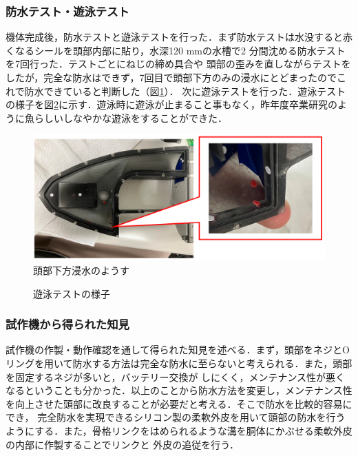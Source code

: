 \subsubsection{防水テスト・遊泳テスト}
機体完成後，防水テストと遊泳テストを行った．まず防水テストは水没すると赤くなるシールを頭部内部に貼り，水深120 mmの水槽で2 分間沈める防水テストを7回行った．テストごとにねじの締め具合や
頭部の歪みを直しながらテストをしたが，完全な防水はできず，7回目で頭部下方のみの浸水にとどまったのでこれで防水できていると判断した（図\ref{fig:bousuitest_sisaku}）．
次に遊泳テストを行った．遊泳テストの様子を図\ref{fig:test_sisaku}に示す．遊泳時に遊泳が止まること事もなく，昨年度卒業研究のように魚らしいしなやかな遊泳をすることができた．

\begin{figure}[t]
    \centering
    \includegraphics[width=0.80\linewidth]{chapters/picture/bousuitest.png}
    \caption{頭部下方浸水のようす}
    \label{fig:bousuitest_sisaku}
\end{figure}
\begin{figure}[t]
    \centering
    \caption{遊泳テストの様子}
    \label{fig:test_sisaku}
\end{figure}

\subsubsection{試作機から得られた知見}
試作機の作製・動作確認を通して得られた知見を述べる．まず，頭部をネジとOリングを用いて防水する方法は完全な防水に至らないと考えられる．また，頭部を固定するネジが多いと，バッテリー交換が
しにくく，メンテナンス性が悪くなるということも分かった．以上のことから防水方法を変更し，メンテナンス性を向上させた頭部に改良することが必要だと考える．そこで防水を比較的容易にでき，
完全防水を実現できるシリコン製の柔軟外皮を用いて頭部の防水を行うようにする．また，骨格リンクをはめられるような溝を胴体にかぶせる柔軟外皮の内部に作製することでリンクと
外皮の追従を行う．